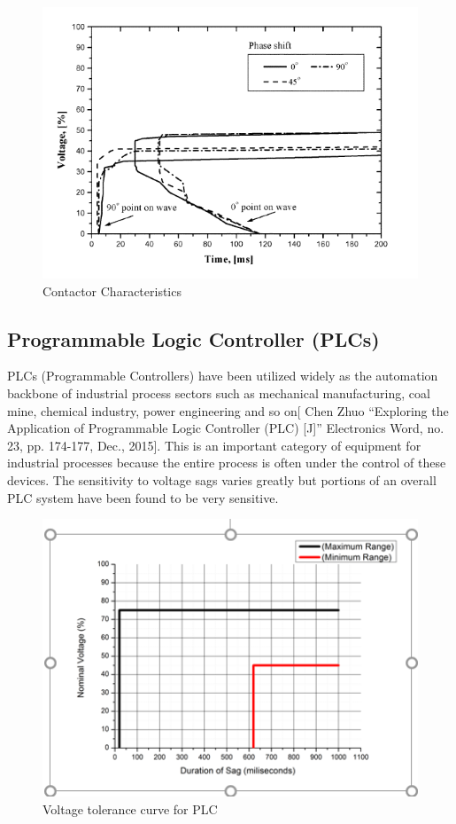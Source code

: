 \documentclass[17pt, a4paper]{extreport}
\begin{document}
\begin{enumerate}
\begin{figure}
     \includegraphics[width=\textwidth]{contactor.png}
     \caption{Contactor Characteristics}
     \label{fig:contactor_characteristics}
 \end{figure}
 \subsection{Programmable Logic Controller (PLCs) } PLCs (Programmable Controllers) have been utilized widely as the automation backbone of industrial process sectors such as mechanical manufacturing, coal mine, chemical industry, power engineering and so on[ Chen Zhuo “Exploring the Application of Programmable Logic Controller (PLC) [J]” Electronics Word, no. 23, pp. 174-177, Dec., 2015]. This is an important category of equipment for industrial processes because the entire process is often under the control of these devices. The sensitivity to voltage sags varies greatly but portions of an overall PLC system have been found to be very sensitive. 
 
 \begin{figure}
     \centering
     \includegraphics[width=\textwidth]{plc.PNG}
     \caption{Voltage tolerance curve for PLC}
     \label{fig:my_label}
 \end{figure}
 

\end{enumerate}
\end{document}
